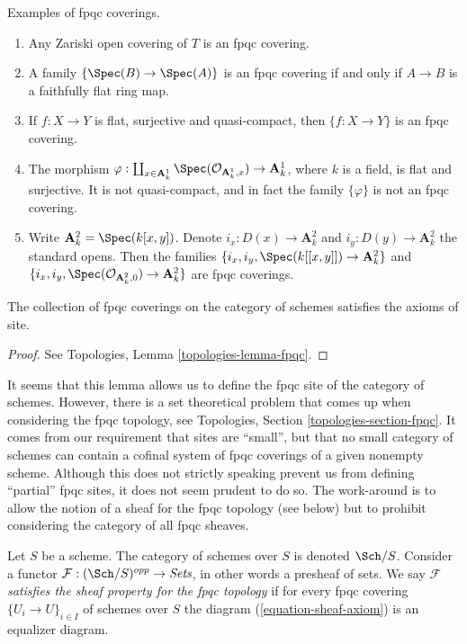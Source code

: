 \begin{example}
\label{example-fpqc-coverings}
Examples of fpqc coverings.
\begin{enumerate}
\item Any Zariski open covering of $T$ is an fpqc covering.
\item A family $\{\Spec(B) \to \Spec(A)\}$ is an fpqc
covering if and only if $A \to B$ is a faithfully flat ring map.
\item If $f: X \to Y$ is flat, surjective and quasi-compact, then $\{ f: X\to
Y\}$ is an fpqc covering.
\item The morphism
$\varphi :
\coprod_{x \in \mathbf{A}^1_k} \Spec(\mathcal{O}_{\mathbf{A}^1_k, x})
\to \mathbf{A}^1_k$,
where $k$ is a field, is flat and surjective. It is not quasi-compact, and
in fact the family $\{\varphi\}$ is not an fpqc covering.
\item Write
$\mathbf{A}^2_k = \Spec(k[x, y])$. Denote $i_x : D(x) \to \mathbf{A}^2_k$
and $i_y : D(y) \to \mathbf{A}^2_k$ the standard opens.
Then the families
$\{i_x, i_y, \Spec(k[[x, y]]) \to \mathbf{A}^2_k\}$
and
$\{i_x, i_y, \Spec(\mathcal{O}_{\mathbf{A}^2_k, 0}) \to \mathbf{A}^2_k\}$
are fpqc coverings.
\end{enumerate}
\end{example}

\begin{lemma}
\label{lemma-site-fpqc}
The collection of fpqc coverings on the category of schemes
satisfies the axioms of site.
\end{lemma}

\begin{proof}
See Topologies, Lemma \ref{topologies-lemma-fpqc}.
\end{proof}

\noindent
It seems that this lemma allows us to define the fpqc site of the category
of schemes. However, there is a set theoretical problem that comes up when
considering the fpqc topology, see
Topologies, Section \ref{topologies-section-fpqc}.
It comes from our requirement that sites are ``small'', but that no small
category of schemes can contain a cofinal system of fpqc coverings of a
given nonempty scheme. Although this does not strictly speaking prevent
us from defining  ``partial'' fpqc
sites, it does not seem prudent to do so. The work-around is to allow
the notion of a sheaf for the fpqc topology (see below) but to prohibit
considering the category of all fpqc sheaves.

\begin{definition}
\label{definition-sheaf-property-fpqc}
Let $S$ be a scheme. The category of schemes over $S$ is denoted
$\Sch/S$. Consider a functor
$\mathcal{F} : (\Sch/S)^{opp} \to \textit{Sets}$, in other words
a presheaf of sets. We say $\mathcal{F}$
{\it satisfies the sheaf property for the fpqc topology}
if for every fpqc covering $\{U_i \to U\}_{i \in I}$ of schemes over $S$
the diagram (\ref{equation-sheaf-axiom}) is an equalizer diagram.
\end{definition}

